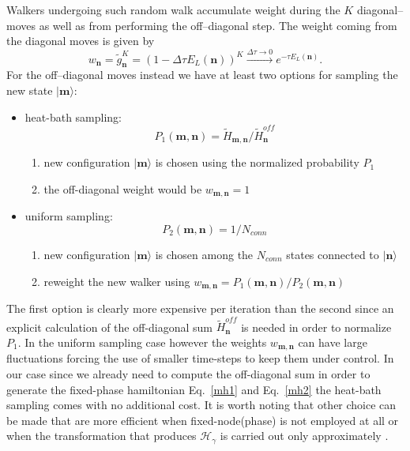 Walkers undergoing such random walk accumulate weight during the $K$ diagonal--moves as well as from performing the off--diagonal step. The weight coming from the diagonal
moves is given by
\begin{equation}
w_{\mathbf{n}}=\widetilde{g}_{\mathbf{n}}^K = \left( 1-\Delta\tau E_L(\mathbf{n})\right)^K \xrightarrow{\Delta\tau \to 0} e^{-\tau E_L(\mathbf{n})}.
\end{equation}
For the off--diagonal moves instead we have at least two options for sampling the new state $\rvert \mathbf{m}\rangle$:
\begin{itemize}
 \item heat-bath sampling: 
 \begin{equation}
 \label{eq:heba}
P_1(\mathbf{m},\mathbf{n})=\widetilde{H}_{\mathbf{m},\mathbf{n}}/ \widetilde{H}^{off}_{\mathbf{n}}  
 \end{equation} 
\begin{enumerate}
 \item new configuration $\rvert \mathbf{m}\rangle$ is chosen using the normalized probability $P_1$
 \item the off-diagonal weight would be $w_{\mathbf{m},\mathbf{n}}=1$
\end{enumerate}

 \item uniform sampling: 
 \begin{equation}
P_2(\mathbf{m},\mathbf{n})=1/N_{conn}
\end{equation}
\begin{enumerate}
 \item new configuration $\rvert \mathbf{m}\rangle$ is chosen among the $N_{conn}$ states connected to $\rvert\mathbf{n}\rangle$
 \item reweight the new walker using $w_{\mathbf{m},\mathbf{n}} = P_1(\mathbf{m},\mathbf{n})/P_2(\mathbf{m},\mathbf{n})$
\end{enumerate}
\end{itemize}

The first option is clearly more expensive per iteration than the second since an explicit calculation of the off-diagonal sum $\widetilde{H}^{off}_{\mathbf{n}}$ is 
needed in order to normalize $P_1$. In the uniform sampling case however the weights $w_{\mathbf{m},\mathbf{n}}$ can have large fluctuations
forcing the use of smaller time-steps to keep them under control. In our case since we already need to compute the off-diagonal
sum in order to generate the fixed-phase hamiltonian Eq.~\eqref{mh1} and Eq.~\eqref{mh2} the heat-bath sampling comes with no additional
cost. It is worth noting that other choice can be made that are more efficient when fixed-node(phase) is not employed at all \cite{Holmes16}
or when the transformation that produces $\mathcal{H}_\gamma$ is carried out only approximately \cite{Kolodrubetz12}.

